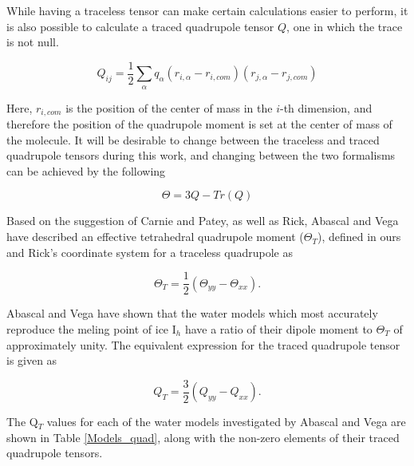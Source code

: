 While having a traceless tensor can make certain calculations easier to 
perform, it is also possible to calculate a traced quadrupole tensor $Q$, one
in which the trace is not null.

\begin{equation}
Q_{ij} = \frac{1}{2}\sum_{\alpha}q_{\alpha}(r_{i,\alpha}-r_{i,com})(r_{j,\alpha}-r_{j,com})
\end{equation}

Here, $r_{i,com}$ is the position of the center of mass in the $i$-th 
dimension, and therefore the position of the quadrupole moment is set at the 
center of mass of the molecule. It will be desirable to change between the
traceless and traced quadrupole tensors during this work, and changing 
between the two formalisms can be achieved by the following

\begin{equation}
\Theta = 3Q - Tr(Q)
\end{equation}    

Based on the suggestion of Carnie and Patey\cite{Carnie82}, 
as well as Rick\cite{Rick04}, Abascal and Vega have described an effective 
tetrahedral quadrupole moment ($\Theta_T$), defined in ours and Rick's 
coordinate 
system for a traceless quadrupole as

\begin{equation}
\Theta_{T} = \frac{1}{2}(\Theta_{yy} - \Theta_{xx}).
\end{equation} 

Abascal and Vega have shown that the water models which most accurately
reproduce the meling point of ice I$_h$ have a ratio of their dipole moment
to $\Theta_T$ of approximately unity. The equivalent expression for the 
traced quadrupole tensor is given as

\begin{equation}
Q_{T} = \frac{3}{2}(Q_{yy} - Q_{xx}).
\end{equation}
 
The Q$_T$ values for each of the water models
investigated by Abascal and Vega are shown in Table \ref{Models_quad}, along 
with the non-zero elements of their traced quadrupole tensors.

